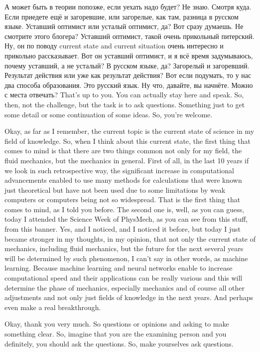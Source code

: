 \documentclass[main.tex]{subfiles}
\begin{document}
А может быть в теории попозже, если уехать надо будет?
Не знаю.
Смотря куда.
Если приедете ещё и загоревшие, или загорелые, как там, разница в русском языке.
Уставший оптимист или усталый оптимист, да?
Вот сразу думаешь.
Не смотрите этого блогера?
Уставший оптимист, такой очень прикольный питерский.
Ну, он по поводу current state and current situation очень интересно и прикольно рассказывает.
Вот он уставший оптимист, и я всё время задумываюсь, почему уставший, а не усталый?
В русском языке, да?
Загорелый и загоревший.
Результат действия или уже как результат действия?
Вот если подумать, то у нас два способа образования.
Это русский язык.
Ну что, давайте, вы начнёте.
Можно с места отвечать?
That's up to you.
You can actually stay here and speak.
So, then, not the challenge, but the task is to ask questions.
Something just to get some detail or some continuation of some ideas.
So, you're welcome.

{}

Okay, as far as I remember, the current topic is the current state of science in my field of knowledge.
So, when I think about this current state, the first thing that comes to mind is that there are two things common not only for my field, the fluid mechanics, but the mechanics in general.
First of all, in the last 10 years if we look in such retrospective way, the significant increase in computational advancements enabled to use many methods for calculations that were known just theoretical but have not been used due to some limitations by weak computers or computers being not so widespread.
That is the first thing that comes to mind, as I told you before.
The second one is, well, as you can guess, today I attended the Science Week of PhysMech, as you can see from this stuff, from this banner.
Yes, and I noticed, and I noticed it before, but today I just became stronger in my thoughts, in my opinion, that not only the current state of mechanics, including fluid mechanics, but the future for the next several years will be determined by such phenomenon, I can't say in other words, as machine learning.
Because machine learning and neural networks enable to increase computational speed and their applications can be really various and this will determine the phase of mechanics, especially mechanics and of course all other adjustments and not only just fields of knowledge in the next years.
And perhaps even make a real breakthrough.

Okay, thank you very much.
So questions or opinions and asking to make something clear.
So, imagine that you are the examining person and you definitely, you should ask the questions.
So, make yourselves ask questions.
\end{document}
